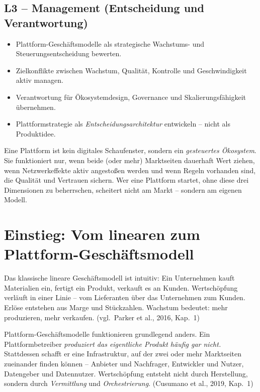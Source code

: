 \documentclass[11pt,a4paper,oneside]{article}
\newcommand{\quelle}[1]{{\footnotesize\color{lpGray}(#1)}}
\begin{document}
\subsection*{L3 -- Management (Entscheidung und Verantwortung)}
\begin{itemize}
  \item Plattform-Geschäftsmodelle als strategische Wachstums- und Steuerungsentscheidung bewerten.
  \item Zielkonflikte zwischen Wachstum, Qualität, Kontrolle und Geschwindigkeit aktiv managen.
  \item Verantwortung für Ökosystemdesign, Governance und Skalierungsfähigkeit übernehmen.
  \item Plattformstrategie als \emph{Entscheidungsarchitektur} entwickeln -- nicht als Produktidee.
\end{itemize}

\begin{merkbox}
Eine Plattform ist kein digitales Schaufenster, sondern ein \emph{gesteuertes Ökosystem}. Sie funktioniert nur, wenn beide (oder mehr) Marktseiten dauerhaft Wert ziehen, wenn Netzwerkeffekte aktiv angestoßen werden und wenn Regeln vorhanden sind, die Qualität und Vertrauen sichern. Wer eine Plattform startet, ohne diese drei Dimensionen zu beherrschen, scheitert nicht am Markt -- sondern am eigenen Modell.
\end{merkbox}

\clearpage

\section{Einstieg: Vom linearen zum Plattform-Geschäftsmodell}

Das klassische lineare Geschäftsmodell ist intuitiv: Ein Unternehmen kauft Materialien ein, fertigt ein Produkt, verkauft es an Kunden. Wertschöpfung verläuft in einer Linie -- vom Lieferanten über das Unternehmen zum Kunden. Erlöse entstehen aus Marge und Stückzahlen. Wachstum bedeutet: mehr produzieren, mehr verkaufen. \quelle{vgl.\ Parker et al., 2016, Kap.~1}

Plattform-Geschäftsmodelle funktionieren grundlegend anders. Ein Plattformbetreiber \emph{produziert das eigentliche Produkt häufig gar nicht.} Stattdessen schafft er eine Infrastruktur, auf der zwei oder mehr Marktseiten zueinander finden können -- Anbieter und Nachfrager, Entwickler und Nutzer, Datengeber und Datennutzer. Wertschöpfung entsteht nicht durch Herstellung, sondern durch \emph{Vermittlung} und \emph{Orchestrierung}. \quelle{Cusumano et al., 2019, Kap.~1}
\end{document}
